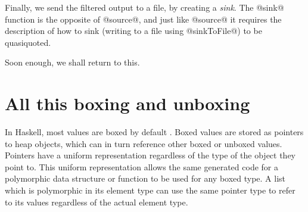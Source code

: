 Finally, we send the filtered output to a file, by creating a \emph{sink}.
The @sink@ function is the opposite of @source@, and just like @source@ it requires the description of how to sink (writing to a file using @sinkToFile@) to be quasiquoted.

Soon enough, we shall return to this.


% 
% 

% 
% 
% 



\section{All this boxing and unboxing}

In Haskell, most values are boxed by default \citep{jones1991unboxed}.
Boxed values are stored as pointers to heap objects, which can in turn reference other boxed or unboxed values.
Pointers have a uniform representation regardless of the type of the object they point to.
This uniform representation allows the same generated code for a polymorphic data structure or function to be used for any boxed type.
A list which is polymorphic in its element type can use the same pointer type to refer to its values regardless of the actual element type.

